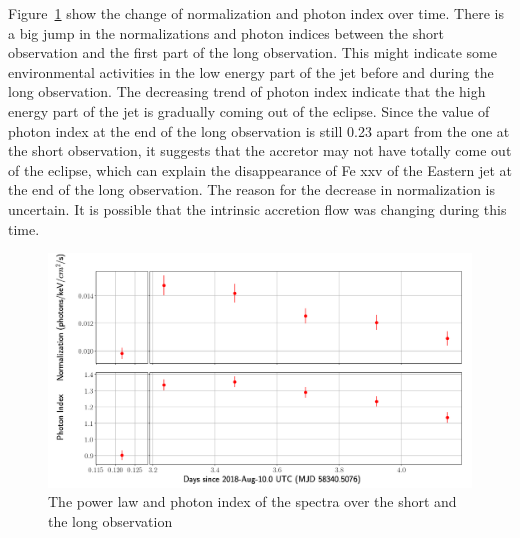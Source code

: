 Figure~\ref{power_law} show the change of normalization and photon index over time. There is a big jump in the normalizations and photon indices between the short observation and the first part of the long observation.  This might indicate some environmental activities in the low energy part of the jet before and during the long observation. The decreasing trend of photon index indicate that the high energy part of the jet is gradually coming out of the eclipse. Since the value of photon index at the end of the long observation is still 0.23 apart from the one at the short observation, it suggests that the accretor may not have totally come out of the eclipse, which can explain the disappearance of Fe {\sc xxv} of the Eastern jet at the end of the long observation. The reason for the decrease in normalization is uncertain. It is possible that the intrinsic accretion flow was changing during this time. 

\begin{figure}
    \centering
    \includegraphics[width = \linewidth] {Chapters/Figures/powerlaw.png}
    \caption{The power law and photon index of the spectra over the short and the long observation}
    \label{power_law}
\end{figure}


